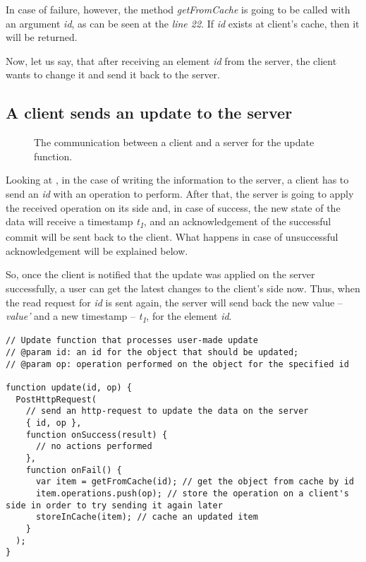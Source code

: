 In case of failure, however, the method \textit{getFromCache} is going to be called with an argument \textit{id}, as can be seen at the \textit{line 22}. If \textit{id} exists at client's cache, then it will be returned. 


Now, let us say, that after receiving an element \textit{id} from the server, the client wants to change it and send it back to the server.

\subsection*{A client sends an update to the server}

\begin{figure}[!htb]
    \begin{center}
    \def\svgwidth{\linewidth}
    
    \caption {The communication between a client and a server for the update function.}
    \label{fig:design3}
\end{center}
\end{figure}

Looking at , in the case of writing the information to the server, a client has to send an \textit{id} with an operation to perform. After that, the server is going to apply the received operation on its side and, in case of success, the new state of the data will receive a timestamp \textit{t\textsubscript{1}}, and an acknowledgement of the successful commit will be sent back to the client. What happens in case of unsuccessful acknowledgement will be explained below. 

So, once the client is notified that the update was applied on the server successfully, a user can get the latest changes to the client's side now. Thus, when the read request for \textit{id} is sent again, the server will send back the new value -- \textit{value'} and a new timestamp -- \textit{t\textsubscript{1}}, for the element \textit{id}.

\begin{lstlisting}[caption={Pseudocode for making a request to change the data: client.}, label={lst:update1}]
// Update function that processes user-made update
// @param id: an id for the object that should be updated;
// @param op: operation performed on the object for the specified id

function update(id, op) {
  PostHttpRequest(
    // send an http-request to update the data on the server
    { id, op },
    function onSuccess(result) {
      // no actions performed
    },
    function onFail() {
      var item = getFromCache(id); // get the object from cache by id
      item.operations.push(op); // store the operation on a client's side in order to try sending it again later
      storeInCache(item); // cache an updated item
    }
  );
}
\end{lstlisting} 

